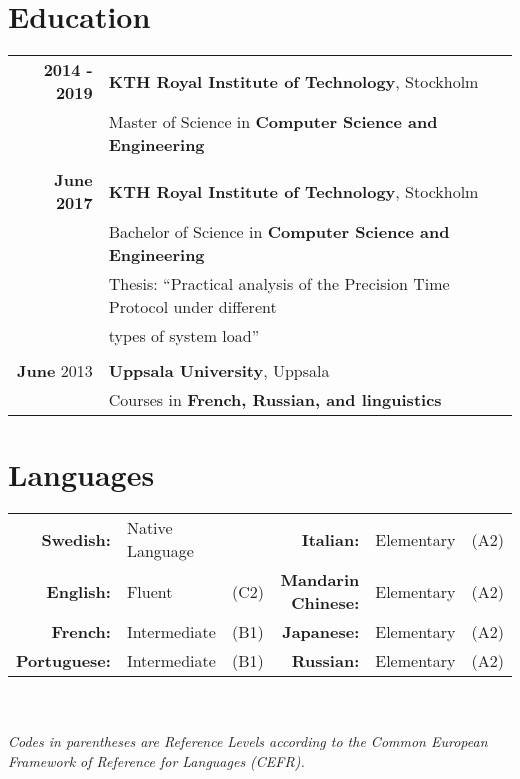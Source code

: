 \documentclass[a4paper,10pt]{article}
\begin{document}
\section{Education}
\begin{tabular}{r|l}
\textbf{2014 - 2019} & \textbf{KTH Royal Institute of Technology}, Stockholm\\
& Master of Science in \textbf{Computer Science and Engineering}\\&\\
\textbf{June 2017} & \textbf{KTH Royal Institute of Technology}, Stockholm \\& Bachelor of Science in \textbf{Computer Science and Engineering}\\ & \footnotesize{Thesis: ``Practical analysis of the Precision Time Protocol under different} \\& \footnotesize{types of system load''}\\ \\
\textbf{June} 2013& \textbf{Uppsala University}, Uppsala\\& Courses in \textbf{French, Russian, and linguistics}
\end{tabular}

\section{Languages}
\begin{tabular}{rll|rll}
\textbf{Swedish:}&Native Language&&
\textbf{Italian:}&Elementary&(A2)\\
\textbf{English:}&Fluent&(C2)&
\textbf{Mandarin Chinese:}&Elementary&(A2)\\
\textbf{French:}&Intermediate&(B1)&
\textbf{Japanese:}&Elementary&(A2)\\
\textbf{Portuguese:}&Intermediate&(B1)&
\textbf{Russian:}&Elementary&(A2)
\end{tabular}
\\ \\
\textit{Codes in parentheses are Reference Levels according to the Common European Framework of Reference for Languages (CEFR).}
\end{document}
